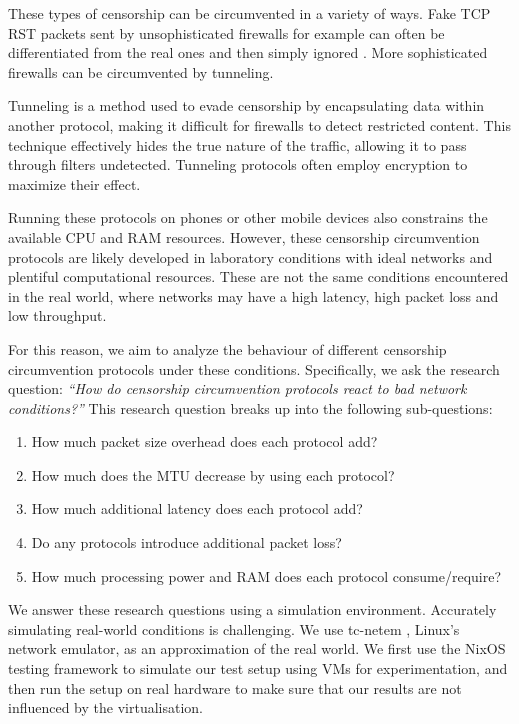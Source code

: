 These types of censorship can be circumvented in a variety of ways.
Fake TCP RST packets sent by unsophisticated firewalls for example can often be differentiated from the real ones and then simply ignored \cite{GoodbyeDPI-passive}.
More sophisticated firewalls can be circumvented by tunneling.

Tunneling is a method used to evade censorship by encapsulating data within another protocol, making it difficult for firewalls to detect restricted content.
This technique effectively hides the true nature of the traffic, allowing it to pass through filters undetected.
Tunneling protocols often employ encryption to maximize their effect.

Running these protocols on phones or other mobile devices also constrains the available CPU and RAM resources.
However, these censorship circumvention protocols are likely developed in laboratory conditions with ideal networks and plentiful computational resources.
These are not the same conditions encountered in the real world, where networks may have a high latency, high packet loss and low throughput.

For this reason, we aim to analyze the behaviour of different censorship circumvention protocols under these conditions.
Specifically, we ask the research question:
\emph{``How do censorship circumvention protocols react to bad network conditions?''}
This research question breaks up into the following sub-questions:
\begin{enumerate}
  \item How much packet size overhead does each protocol add?
  \item How much does the MTU decrease by using each protocol?
  \item How much additional latency does each protocol add?
  \item Do any protocols introduce additional packet loss?
  \item How much processing power and RAM does each protocol consume/require?
\end{enumerate}

We answer these research questions using a simulation environment.
Accurately simulating real-world conditions is challenging.
We use tc-netem \cite{man8:tc-netem}, Linux's network emulator, as an approximation of the real world.
We first use the NixOS testing framework to simulate our test setup using VMs for experimentation, and then run the setup on real hardware to make sure that our results are not influenced by the virtualisation.

